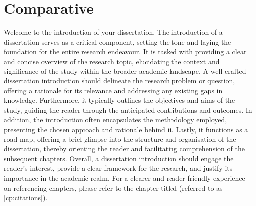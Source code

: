 \chapter{Comparative}
\label{cp:Comparative}
Welcome to the introduction of your dissertation. The introduction of a dissertation serves as a critical component, setting the tone and laying the foundation for the entire research endeavour. It is tasked with providing a clear and concise overview of the research topic, elucidating the context and significance of the study within the broader academic landscape. A well-crafted dissertation introduction should delineate the research problem or question, offering a rationale for its relevance and addressing any existing gaps in knowledge. Furthermore, it typically outlines the objectives and aims of the study, guiding the reader through the anticipated contributions and outcomes. In addition, the introduction often encapsulates the methodology employed, presenting the chosen approach and rationale behind it. Lastly, it functions as a road-map, offering a brief glimpse into the structure and organisation of the dissertation, thereby orienting the reader and facilitating comprehension of the subsequent chapters. Overall, a dissertation introduction should engage the reader's interest, provide a clear framework for the research, and justify its importance in the academic realm. For a clearer and reader-friendly experience on referencing chapters, please refer to the chapter titled  (referred to as \autoref{cp:citations}).